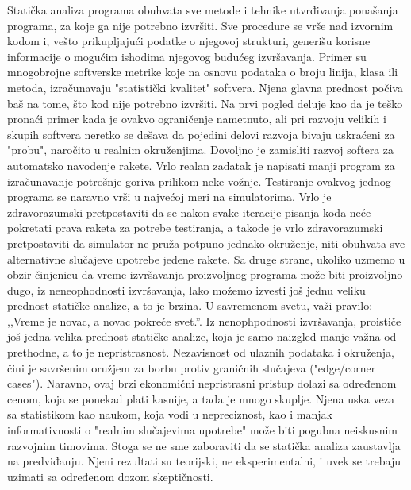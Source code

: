 \documentclass[12pt,oneside]{memoir}
\begin{document}
Statička analiza programa obuhvata sve metode i tehnike utvrđivanja ponašanja programa, za koje ga nije potrebno izvršiti. Sve procedure se vrše nad izvornim kodom i, vešto prikupljajući podatke o njegovoj strukturi, generišu korisne informacije o mogućim ishodima njegovog budućeg izvršavanja. Primer su mnogobrojne softverske metrike koje na osnovu podataka o broju linija, klasa ili metoda, izračunavaju "statistički kvalitet" softvera. Njena glavna prednost počiva baš na tome, što kod nije potrebno izvršiti. Na prvi pogled deluje kao da je teško pronaći primer kada je ovakvo ograničenje nametnuto, ali pri razvoju velikih i skupih softvera neretko se dešava da pojedini delovi razvoja bivaju uskraćeni za "probu", naročito u realnim okruženjima. Dovoljno je zamisliti razvoj softera za automatsko navođenje rakete. Vrlo realan zadatak je napisati manji program za izračunavanje potrošnje goriva prilikom neke vožnje. Testiranje ovakvog jednog programa se naravno vrši u najvećoj meri na simulatorima. Vrlo je zdravorazumski pretpostaviti da se nakon svake iteracije pisanja koda neće pokretati prava raketa za potrebe testiranja, a takođe je vrlo zdravorazumski pretpostaviti da simulator ne pruža potpuno jednako okruženje, niti obuhvata sve alternativne slučajeve upotrebe jedene rakete. Sa druge strane, ukoliko uzmemo u obzir činjenicu da vreme izvršavanja proizvoljnog programa može biti proizvoljno dugo, iz neneophodnosti izvršavanja, lako možemo izvesti još jednu veliku prednost statičke analize, a to je brzina. U savremenom svetu, važi pravilo: ,,Vreme je novac, a novac pokreće svet.”. Iz nenophpodnosti izvršavanja, proističe još jedna velika prednost statičke analize, koja je samo naizgled manje važna od prethodne, a to je nepristrasnost. Nezavisnost od ulaznih podataka i okruženja, čini je savršenim oružjem za borbu protiv graničnih slučajeva ("edge/corner cases"). Naravno, ovaj brzi ekonomični nepristrasni pristup dolazi sa određenom cenom, koja se ponekad plati kasnije, a tada je mnogo skuplje. Njena uska veza sa statistikom kao naukom, koja vodi u nepreciznost, kao i manjak informativnosti o "realnim slučajevima upotrebe" može biti pogubna neiskusnim razvojnim timovima. Stoga se ne sme zaboraviti da se statička analiza zaustavlja na predviđanju. Njeni rezultati su teorijski, ne eksperimentalni, i uvek se trebaju uzimati sa određenom dozom skeptičnosti.
\end{document}
